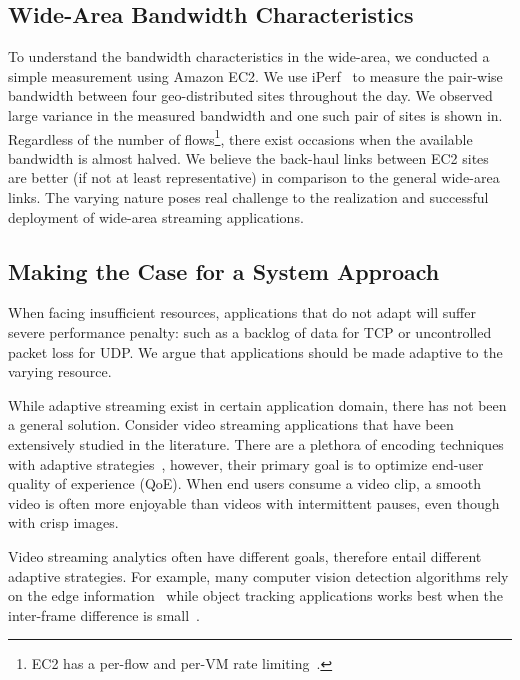 \subsection{Wide-Area Bandwidth Characteristics}
\label{sec:making-case-adapt}

To understand the bandwidth characteristics in the wide-area, we conducted a
simple measurement using Amazon EC2. We use iPerf~\cite{iperf3} to measure the
pair-wise bandwidth between four geo-distributed sites throughout the day. We
observed large variance in the measured bandwidth and one such pair of sites is
shown in. Regardless of the number of flows\footnote{EC2 has a per-flow and
  per-VM rate limiting~\cite{zhang2016guaranteeing}.}, there exist occasions
when the available bandwidth is almost halved. We believe the back-haul links
between EC2 sites are better (if not at least representative) in comparison to
the general wide-area links. The varying nature poses real challenge to the
realization and successful deployment of wide-area streaming applications.

\subsection{Making the Case for a System Approach}
\label{sec:bat}

When facing insufficient resources, applications that do not adapt will suffer
severe performance penalty: such as a backlog of data for TCP or uncontrolled
packet loss for UDP. We argue that applications should be made adaptive to the
varying resource.

While adaptive streaming exist in certain application domain, there has not been
a general solution. Consider video streaming applications that have been
extensively studied in the literature. There are a plethora of encoding
techniques~\cite{richardson2011h, grange2016vp9} with adaptive
strategies~\cite{yin2015control, michalos2012dynamic, pantos2016http}, however,
their primary goal is to optimize end-user quality of experience (QoE).  When
end users consume a video clip, a smooth video is often more enjoyable than
videos with intermittent pauses, even though with crisp images.

Video streaming analytics often have different goals, therefore entail different
adaptive strategies. For example, many computer vision detection algorithms rely
on the edge information~\cite{canny1986computational, lowe2004distinctive,
  viola2001rapid} while object tracking applications works best when the
inter-frame difference is small~\cite{allen2004object}.

